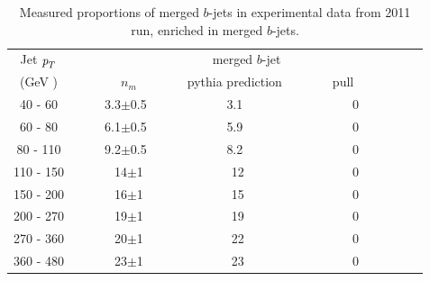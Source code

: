 \begin{table}[!hbt] %
\renewcommand{\arraystretch}{1.2}
\centering
\begin{tabular}{ | c || c | c | c ||}
  \hline
  Jet ${\emph{p}_{T}}$ & \multicolumn{3}{c||}{merged $b$-jet}\\ \cline{2-4}
    (GeV ) & ~~~~~~~$n_m$~~~~~~ & pythia prediction & ~~~~~~pull~~~~~~~~~~\\ \hline
   40 - 60 &  3.3$\pm$0.5  &  3.1  &  0  \\  
   60 - 80 &  6.1$\pm$0.5  &  5.9  &  0  \\ 
   80 - 110&  9.2$\pm$0.5  &  8.2  &  0  \\ 
  110 - 150&  ~14$\pm$1    &  ~12  &  0  \\ 
  150 - 200&  ~16$\pm$1    &  ~15  &  0  \\ 
  200 - 270&  ~19$\pm$1    &  ~19  &  0  \\ 
  270 - 360&  ~20$\pm$1    &  ~22  &  0  \\ 
  360 - 480&  ~23$\pm$1    &  ~23  &  0  \\ \hline
\end{tabular}
\caption{Measured proportions of merged $b$-jets in experimental data from 2011 run, enriched in merged $b$-jets.}
\label{tb:fitfractions2btagM}
\end{table}

